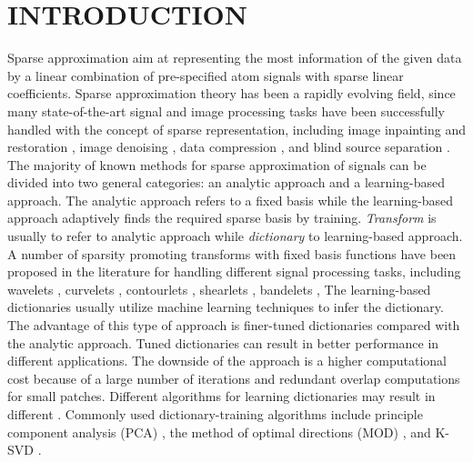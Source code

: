 \section{INTRODUCTION}
Sparse approximation aim at representing the most information of the given data by a linear combination of pre-specified atom signals with sparse linear coefficients. Sparse approximation theory has been a rapidly evolving field, since many state-of-the-art signal and image processing tasks have been successfully handled with the concept of sparse representation, including image inpainting and restoration \cite[]{elad2005,mairal2008,mairal2009,youli2011,jianfeng2013}, image denoising \cite[]{protter2009,jianfeng2013}, data compression \cite[]{bryt2008}, and blind source separation \cite[]{zib2001}. The majority of known methods for sparse approximation of signals can be divided into two general categories: an analytic approach and a learning-based approach. The analytic approach refers to a fixed basis while the learning-based approach adaptively finds the required sparse basis by training. \emph{Transform} is usually   to refer to analytic approach while \emph{dictionary}   to learning-based approach. A number of sparsity promoting transforms with fixed basis functions have been proposed in the literature for handling different signal processing tasks, including wavelets \cite[]{sweldens1995,mallat2009}, curvelets \cite[]{candes20061,jianwei2010}, contourlets \cite[]{do2005}, shearlets \cite[]{labate2005},  bandelets \cite[]{lepennec2005},  The learning-based dictionaries usually utilize machine learning techniques to infer the dictionary. The advantage of this type of approach is finer-tuned dictionaries compared with the analytic approach. Tuned dictionaries can result in better performance in different applications. The downside of the  approach is a higher computational cost because of a large number of iterations and redundant overlap computations for small patches. Different algorithms for learning dictionaries may result in different . Commonly used dictionary-training algorithms include principle component analysis (PCA) \cite[]{jolliffe2002,vidal2005}, the method of optimal directions (MOD) \cite[]{engan1999}, and  K-SVD \cite[]{aharon2006}. 

